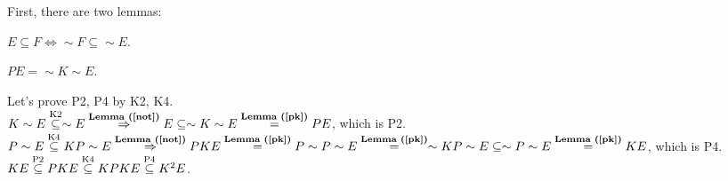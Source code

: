 \begin{pr}
First, there are two lemmas:

\begin{lm}\label{not}
$E\subseteq F\iff\sim F\subseteq\sim E$.
\end{lm}

\begin{lm}\label{pk}
$PE=\sim K\sim E$.
\end{lm}

Let's prove P2, P4 by K2, K4.\\
$K\sim E\overtext{K2}\subseteq\sim E\overtext{\rflm{not}}\then E\subseteq\sim K\sim E\overtext{\rflm{pk}}=PE$, which is P2.\\
$P\sim E\overtext{K4}\subseteq KP\sim E\overtext{\rflm{not}}\then PKE\overtext{\rflm{pk}}=P\sim P\sim E\overtext{\rflm{pk}}=\sim KP\sim E\subseteq\sim P\sim E\overtext{\rflm{pk}}=KE$, which is P4.\\
$KE\overset{\text{P2}}\subseteq PKE\overset{\text{K4}}\subseteq KPKE\overset{\text{P4}}\subseteq K^2E$.
\end{pr}
